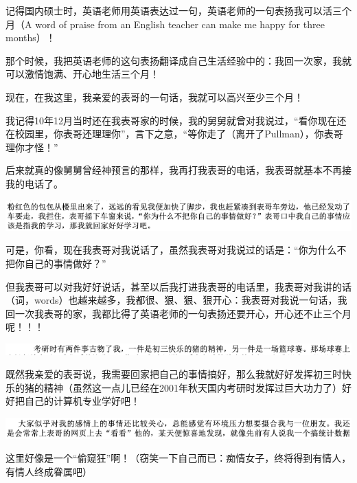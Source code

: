 \documentclass[9pt, b5paper]{article}
\begin{document}
记得国内硕士时，英语老师用英语表达过一句，英语老师的一句表扬我可以活三个月（A word of praise from an English teacher can make me happy for three months）！

那个时候，我把英语老师的这句表扬翻译成自己生活经验中的：我回一次家，我就可以激情饱满、开心地生活三个月！

现在，在我这里，我亲爱的表哥的一句话，我就可以高兴至少三个月！

我记得10年12月当时还在我表哥家的时候，我的舅舅就曾对我说过，“看你现在还在校园里，你表哥还理理你”，言下之意，“等你走了（离开了Pullman），你表哥理你才怪！”

后来就真的像舅舅曾经神预言的那样，我再打我表哥的电话，我表哥就基本不再接我的电话了。

\begin{center}
\includegraphics[width=.9\linewidth]{./pic/backups_plans_20210502_174020.png}
\end{center}

可是，你看，现在我表哥对我说话了，虽然我表哥对我说过的话是：“你为什么不把你自己的事情做好？”

但我表哥可以对我好好说话，甚至以后我打进我表哥的电话里，我表哥对我讲的话（词，words）也越来越多，我都很、狠、狠、狠开心：我表哥对我说一句话，我回一次我表哥的家，我都比得了英语老师的一句表扬还要开心，开心还不止三个月呢！！！

\begin{center}
\includegraphics[width=.9\linewidth]{./pic/backups_plans_20210502_094250.png}
\end{center}

既然我亲爱的表哥说，我需要回家把自己的事情搞好，那么我就好好发挥初三时快乐的猪的精神（虽然这一点儿已经在2001年秋天国内考研时发挥过巨大功力了）好好把自己的计算机专业学好吧！

\begin{center}
\includegraphics[width=.9\linewidth]{./pic/backups_plans_20210502_094424.png}
\end{center}

这里好像是一个“偷窥狂”啊！（窃笑一下自己而已：痴情女子，终将得到有情人，有情人终成眷属吧）
\end{document}
